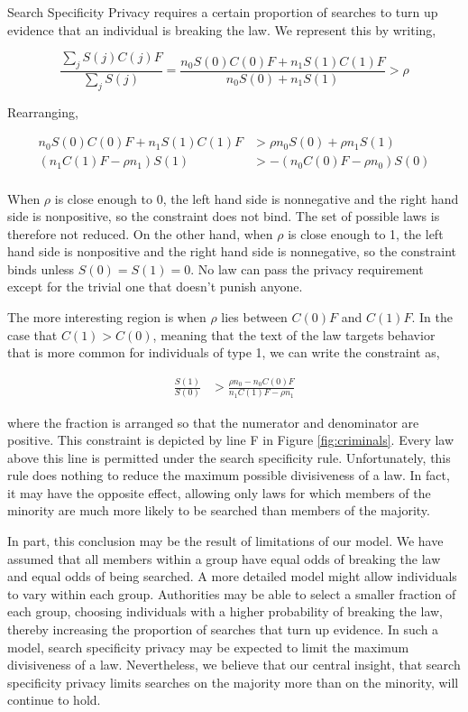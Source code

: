 Search Specificity Privacy requires a certain proportion of searches to turn up evidence that an individual is breaking the law.  We represent this by writing,

$$\frac{\sum_j S(j)C(j)F}{\sum_j S(j)} = \frac{ n_0 S(0)C(0)F + n_1 S(1)C(1)F}{n_0 S(0) + n_1 S(1)}  > \rho$$

Rearranging,

\begin{align}
\nonumber n_0 S(0)C(0)F + n_1 S(1)C(1)F &> \rho n_0 S(0) + \rho n_1 S(1) \\
\nonumber  (n_1 C(1)F - \rho n_1 ) S(1) &>  - (n_0 C(0)F - \rho n_0 )S(0) \\
\end{align}

When $\rho$ is close enough to 0, the left hand side is nonnegative and the right hand side is nonpositive, so the constraint does not bind.  The set of possible laws is therefore not reduced.  On the other hand, when $\rho$ is close enough to 1, the left hand side is nonpositive and the right hand side is nonnegative, so the constraint binds unless $S(0) = S(1) = 0$.  No law can pass the privacy requirement except for the trivial one that doesn't punish anyone.  

The more interesting region is when $\rho$ lies between  $C(0)F$ and $C(1)F$.  In the case that $C(1) > C(0)$, meaning that the text of the law targets behavior that is more common for individuals of type 1, we can write the constraint as,

\begin{align}
\frac{S(1)}{S(0)} &>  \frac{\rho n_0 - n_0 C(0)F }{n_1 C(1)F - \rho n_1}
\end{align}

where the fraction is arranged so that the numerator and denominator are positive.  This constraint is depicted by line F in Figure \ref{fig:criminals}.  Every law above this line is permitted under the search specificity rule.  Unfortunately, this rule does nothing to reduce the maximum possible divisiveness of a law.  In fact, it may have the opposite effect, allowing only laws for which members of the minority are much more likely to be searched than members of the majority.

In part, this conclusion may be the result of limitations of our model.  We have assumed that all members within a group have equal odds of breaking the law and equal odds of being searched.  A more detailed model might allow individuals to vary within each group.  Authorities may be able to select a smaller fraction of each group, choosing individuals with a higher probability of breaking the law, thereby increasing the proportion of searches that turn up evidence.  In such a model, search specificity privacy may be expected to limit the maximum divisiveness of a law.  Nevertheless, we believe that our central insight, that search specificity privacy limits searches on the majority more than on the minority, will continue to hold.






